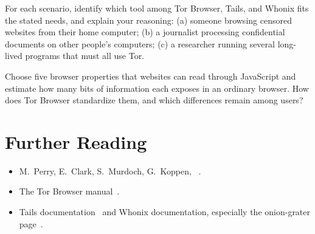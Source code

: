 \begin{esercizio}[2]\label{es:23-scelta}
For each scenario, identify which tool among Tor Browser, Tails, and Whonix fits the stated needs, and explain your reasoning: (a) someone browsing censored websites from their home computer; (b) a journalist processing confidential documents on other people's computers; (c) a researcher running several long-lived programs that must all use Tor.
\end{esercizio}

\begin{esercizio}[3]\label{es:23-impronta}
Choose five browser properties that websites can read through JavaScript and estimate how many bits of information each exposes in an ordinary browser. How does Tor Browser standardize them, and which differences remain among users?
\end{esercizio}

\section*{Further Reading}
\begin{itemize}
  \item M.~Perry, E.~Clark, S.~Murdoch, G.~Koppen, ~\cite{perry2018torbrowser}.
  \item The Tor Browser manual~\cite{tbmanual}.
  \item Tails documentation~\cite{tailsabout} and Whonix documentation, especially the onion-grater page~\cite{whonixgrater}.
\end{itemize}
